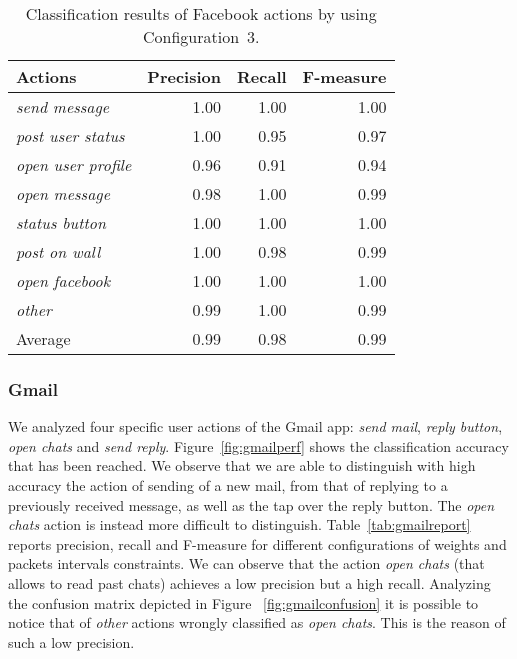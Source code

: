 \documentclass{acm_proc_article-sp}
\begin{document}
  \begin{table}[h!]
\begin{center} {\begin{tabular}{|l|r|r|r|}
  \hline
\textbf{Actions} & \textbf{Precision}& \textbf{Recall} & \textbf{F-measure}\\
  \hline
  \emph{send message} & 1.00 & 1.00 & 1.00 \\ 
  \emph{post user status} & 1.00 & 0.95 & 0.97 \\ 
\emph{open user profile} & 0.96 & 0.91 & 0.94 \\ 
\emph{open message} & 0.98 & 1.00 & 0.99 \\ 
\emph{status button} & 1.00 & 1.00 & 1.00 \\ 
\emph{post on wall} & 1.00 & 0.98 & 0.99 \\ 
\emph{open facebook} & 1.00 & 1.00 & 1.00 \\ 
\emph{other} & 0.99 & 1.00 & 0.99 \\ 
\hline
Average & 0.99 & 0.98 & 0.99 \\ 
  \hline
\end{tabular} }
\end{center}
\caption{ Classification results of Facebook actions by using {Configuration~3}.}

\label{tab:facebookreport}
\end{table}


\subsubsection{Gmail}
\label{ClassPerf:Gmail}
We analyzed four specific user actions of the Gmail app: \emph{send mail}, 
\emph{reply button}, \emph{open chats} and \emph{send reply}. 
Figure~\ref{fig:gmailperf} shows the classification accuracy that has been 
reached. We observe that we are able to distinguish with high 
accuracy the action of sending of a new mail, from that of replying to a 
previously received message, as well as the tap over the reply button. The 
\emph{open chats} action is instead more difficult to distinguish. 
Table~\ref{tab:gmailreport} reports precision, recall and F-measure for 
different configurations of weights and packets intervals 
constraints. We can observe that the action \emph{open chats} 
(that allows to read past chats) achieves a 
low precision but a high recall. Analyzing the confusion matrix depicted in 
Figure ~\ref{fig:gmailconfusion} it is possible to notice that 
 of \emph{other} actions wrongly classified as \emph{open 
chats}. This is the reason of such a low precision.
\end{document}
